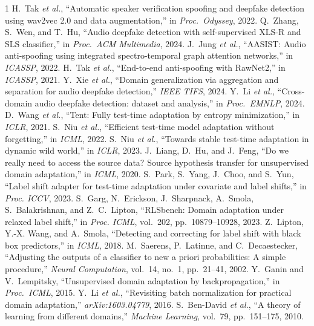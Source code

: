 \documentclass[10pt,letterpaper]{article}
\begin{document}
{\small
\begin{thebibliography}{1}
\small
{} H.~Tak \emph{et al.}, ``Automatic speaker verification
spoofing and deepfake detection using wav2vec 2.0 and data augmentation,'' in
\emph{Proc.\ Odyssey}, 2022.
 Q.~Zhang, S.~Wen, and T.~Hu, ``Audio deepfake detection with
self-supervised XLS-R and SLS classifier,'' in \emph{Proc.\ ACM Multimedia},
2024.
 J.~Jung \emph{et al.}, ``AASIST: Audio anti-spoofing using
integrated spectro-temporal graph attention networks,'' in \emph{ICASSP}, 2022.
 H.~Tak \emph{et al.}, ``End-to-end anti-spoofing with RawNet2,''
in \emph{ICASSP}, 2021.
 Y.~Xie \emph{et al.}, ``Domain generalization via aggregation and
separation for audio deepfake detection,'' \emph{IEEE TIFS}, 2024.
 Y.~Li \emph{et al.}, ``Cross-domain audio deepfake
detection: dataset and analysis,'' in \emph{Proc.\ EMNLP}, 2024.
 D.~Wang \emph{et al.}, ``Tent: Fully test-time adaptation by
entropy minimization,'' in \emph{ICLR}, 2021.
 S.~Niu \emph{et al.}, ``Efficient test-time model adaptation
without forgetting,'' in \emph{ICML}, 2022.
 S.~Niu \emph{et al.}, ``Towards stable test-time adaptation in
dynamic wild world,'' in \emph{ICLR}, 2023.
 J.~Liang, D.~Hu, and J.~Feng, ``Do we really need to access the
source data? Source hypothesis transfer for unsupervised domain adaptation,''
in \emph{ICML}, 2020.
 S.~Park, S.~Yang, J.~Choo, and S.~Yun, ``Label shift adapter for
test-time adaptation under covariate and label shifts,'' in \emph{Proc. ICCV},
2023.
 S.~Garg, N.~Erickson, J.~Sharpnack, A.~Smola,
S.~Balakrishnan, and Z.~C.~Lipton, ``RLSbench: Domain adaptation under relaxed
label shift,'' in \emph{Proc. ICML}, vol.~202, pp.~10879--10928, 2023.
 Z.~Lipton, Y.-X. Wang, and A.~Smola, ``Detecting and correcting
for label shift with black box predictors,'' in \emph{ICML}, 2018.
 M.~Saerens, P.~Latinne, and C.~Decaestecker, ``Adjusting the
outputs of a classifier to new a priori probabilities: A simple procedure,''
\emph{Neural Computation}, vol.\ 14, no.\ 1, pp.\ 21--41, 2002.
 Y.~Ganin and V.~Lempitsky, ``Unsupervised domain adaptation by
backpropagation,'' in \emph{Proc.\ ICML}, 2015.
 Y.~Li \emph{et al.}, ``Revisiting batch normalization for
practical domain adaptation,'' \emph{arXiv:1603.04779}, 2016.
 S.~Ben-David \emph{et al.}, ``A theory of learning from
different domains,'' \emph{Machine Learning}, vol.\ 79, pp.\ 151--175, 2010.

\end{thebibliography}}
\end{document}
